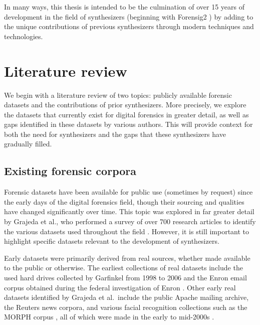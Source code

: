 \documentclass[letterpaper,12pt]{report}
\begin{document}
In many ways, this thesis is intended to be the culmination of over 15
years of development in the field of synthesizers (beginning with
Forensig2 \cite{mochForensicImageGenerator2009}) by adding to the
unique contributions of previous synthesizers through modern techniques
and technologies.

\chapter{Literature review}\label{chapter-two}

We begin with a literature review of two topics: publicly available
forensic datasets and the contributions of prior synthesizers. More
precisely, we explore the datasets that currently exist for digital
forensics in greater detail, as well as gaps identified in these
datasets by various authors. This will provide context for both the need
for synthesizers and the gaps that these synthesizers have gradually
filled.

\section{Existing forensic
corpora}\label{existing-forensic-corpora}

Forensic datasets have been available for public use (sometimes by
request) since the early days of the digital forensics field, though
their sourcing and qualities have changed significantly over time. This
topic was explored in far greater detail by Grajeda et al., who
performed a survey of over 700 research articles to identify the various
datasets used throughout the field
\cite{grajedaAvailabilityDatasetsDigital2017}. However, it is still
important to highlight specific datasets relevant to the development of
synthesizers.

Early datasets were primarily derived from real sources, whether made
available to the public or otherwise. The earliest collections of real
datasets include the used hard drives collected by Garfinkel from 1998
to 2006 and the Enron email corpus obtained during the federal
investigation of Enron \cite{garfinkelForensicCorporaChallenge2007}.
Other early real datasets identified by Grajeda et al.~include the
public Apache mailing archive, the Reuters news corpora, and various
facial recognition collections such as the MORPH corpus
\cite{ricanekMORPHLongitudinalImage2006}, all of which were made in
the early to mid-2000s
\cite{yannikosDataCorporaDigital2014,grajedaAvailabilityDatasetsDigital2017}.
\end{document}
